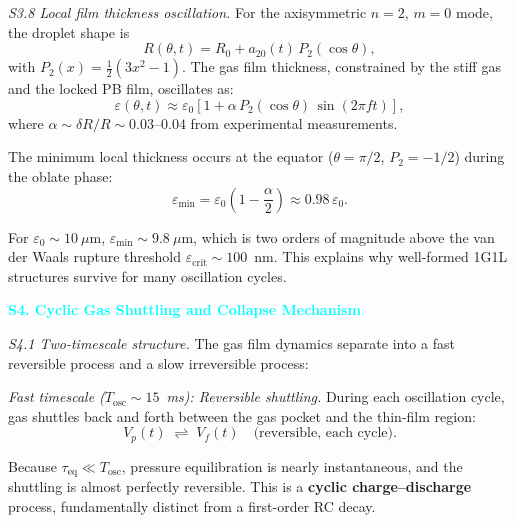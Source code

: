 \documentclass[%
 preprint,
 superscriptaddress,
 amsmath,amssymb,
 aps, prl,
]{revtex4-2}
\begin{document}
{\noindent\textit{S3.8 Local film thickness oscillation.}}
For the axisymmetric $n=2$, $m=0$ mode, the droplet shape is
\begin{equation}
R(\theta,t) = R_0 + a_{20}(t)\,P_2(\cos\theta),
\end{equation}
with $P_2(x) = \frac{1}{2}(3x^2-1)$. The gas film thickness, constrained by the stiff gas and the locked PB film, oscillates as:
\begin{equation}
\varepsilon(\theta,t) \approx \varepsilon_0\left[
1 + \alpha\,P_2(\cos\theta)\,\sin(2\pi f t)
\right],
\label{eq:s3_epsilon_osc}
\end{equation}
where $\alpha \sim \delta R/R \sim 0.03$--$0.04$ from experimental measurements.\par

The minimum local thickness occurs at the equator ($\theta = \pi/2$, $P_2 = -1/2$) during the oblate phase:
\begin{equation}
\varepsilon_{\min} = \varepsilon_0\left(1 - \frac{\alpha}{2}\right)
\approx 0.98\,\varepsilon_0.
\label{eq:s3_epsilon_min}
\end{equation}

For $\varepsilon_0 \sim 10~\mu\text{m}$, $\varepsilon_{\min} \sim 9.8~\mu\text{m}$, which is two orders of magnitude above the van der Waals rupture threshold $\varepsilon_{\text{crit}} \sim 100$~nm. This explains why well-formed 1G1L structures survive for many oscillation cycles.\par

\textcolor{cyan}{\textbf{S4. Cyclic Gas Shuttling and Collapse Mechanism}}\par

{\noindent\textit{S4.1 Two-timescale structure.}}
The gas film dynamics separate into a fast reversible process and a slow irreversible process:\par

\textit{Fast timescale ($T_{\text{osc}} \sim 15$~ms): Reversible shuttling.}
During each oscillation cycle, gas shuttles back and forth between the gas pocket and the thin-film region:
\begin{equation}
V_p(t) \;\rightleftharpoons\; V_f(t) \quad\text{(reversible, each cycle)}.
\end{equation}

Because $\tau_{\text{eq}} \ll T_{\text{osc}}$, pressure equilibration is nearly instantaneous, and the shuttling is almost perfectly reversible. This is a \textbf{cyclic charge--discharge} process, fundamentally distinct from a first-order RC decay.\par
\end{document}
